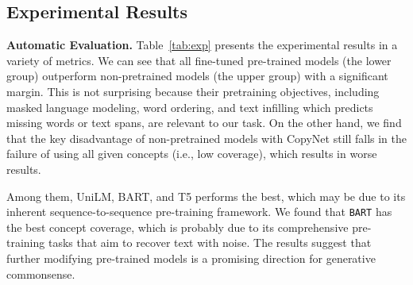 \documentclass[11pt,a4paper]{article}
\begin{document}
	
	
	\subsection{Experimental Results}
		\smallskip
	\noindent
	\textbf{Automatic Evaluation.} 
	Table~\ref{tab:exp} presents the experimental results
in a variety of metrics.
We can see that all fine-tuned pre-trained models (the lower group) outperform  non-pretrained models (the upper group) with a significant margin.
This is not surprising because their pretraining objectives, including masked language modeling, word ordering, and text infilling which predicts missing words or text spans, are relevant to our task. 
	On the other hand, we find that the key disadvantage of non-pretrained models with CopyNet still falls in the failure of using all given concepts (i.e., low coverage), which results in worse results.
	
	
	Among them, UniLM, BART, and T5 performs the best, which may be due to its inherent sequence-to-sequence pre-training framework. 	
	We found that \texttt{BART} has the best concept coverage, which is probably due to its comprehensive pre-training tasks that aim to recover text with noise.
	The results suggest that further modifying  pre-trained models is a promising direction for generative commonsense. 
	








	

















	


	
 
\end{document}
